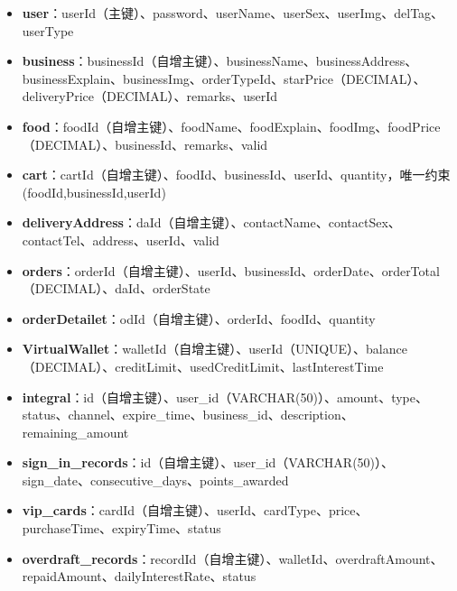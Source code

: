 \begin{itemize}
	\item \textbf{user}：userId（主键）、password、userName、userSex、userImg、delTag、userType
	\item \textbf{business}：businessId（自增主键）、businessName、businessAddress、businessExplain、businessImg、orderTypeId、starPrice（DECIMAL）、deliveryPrice（DECIMAL）、remarks、userId
	\item \textbf{food}：foodId（自增主键）、foodName、foodExplain、foodImg、foodPrice（DECIMAL）、businessId、remarks、valid
	\item \textbf{cart}：cartId（自增主键）、foodId、businessId、userId、quantity，唯一约束(foodId,businessId,userId)
	\item \textbf{deliveryAddress}：daId（自增主键）、contactName、contactSex、contactTel、address、userId、valid
	\item \textbf{orders}：orderId（自增主键）、userId、businessId、orderDate、orderTotal（DECIMAL）、daId、orderState
	\item \textbf{orderDetailet}：odId（自增主键）、orderId、foodId、quantity
	\item \textbf{VirtualWallet}：walletId（自增主键）、userId（UNIQUE）、balance（DECIMAL）、creditLimit、usedCreditLimit、lastInterestTime
	\item \textbf{integral}：id（自增主键）、user\_id（VARCHAR(50)）、amount、type、status、channel、expire\_time、business\_id、description、remaining\_amount
	\item \textbf{sign\_in\_records}：id（自增主键）、user\_id（VARCHAR(50)）、sign\_date、consecutive\_days、points\_awarded
	\item \textbf{vip\_cards}：cardId（自增主键）、userId、cardType、price、purchaseTime、expiryTime、status
	\item \textbf{overdraft\_records}：recordId（自增主键）、walletId、overdraftAmount、repaidAmount、dailyInterestRate、status
\end{itemize}

